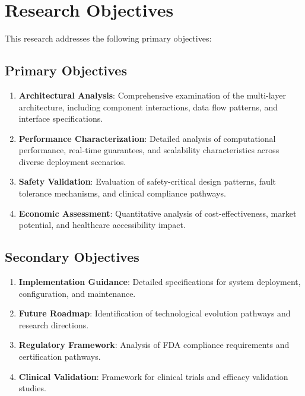 \section{Research Objectives}
\label{sec:research_objectives}

This research addresses the following primary objectives:

\subsection{Primary Objectives}

\begin{enumerate}
    \item \textbf{Architectural Analysis}: Comprehensive examination of the \rus{} multi-layer architecture, including component interactions, data flow patterns, and interface specifications.
    
    \item \textbf{Performance Characterization}: Detailed analysis of computational performance, real-time guarantees, and scalability characteristics across diverse deployment scenarios.
    
    \item \textbf{Safety Validation}: Evaluation of safety-critical design patterns, fault tolerance mechanisms, and clinical compliance pathways.
    
    \item \textbf{Economic Assessment}: Quantitative analysis of cost-effectiveness, market potential, and healthcare accessibility impact.
\end{enumerate}

\subsection{Secondary Objectives}

\begin{enumerate}
    \item \textbf{Implementation Guidance}: Detailed specifications for system deployment, configuration, and maintenance.
    
    \item \textbf{Future Roadmap}: Identification of technological evolution pathways and research directions.
    
    \item \textbf{Regulatory Framework}: Analysis of FDA compliance requirements and certification pathways.
    
    \item \textbf{Clinical Validation}: Framework for clinical trials and efficacy validation studies.
\end{enumerate}

